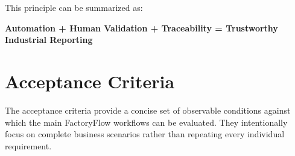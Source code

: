 This principle can be summarized as:

\begin{center}
    \textbf{Automation + Human Validation + Traceability
    = Trustworthy Industrial Reporting}
\end{center}



\section{Acceptance Criteria}
\label{sec:acceptance-criteria}

The acceptance criteria provide a concise set of observable conditions against
which the main FactoryFlow workflows can be evaluated. They intentionally
focus on complete business scenarios rather than repeating every individual
requirement.

